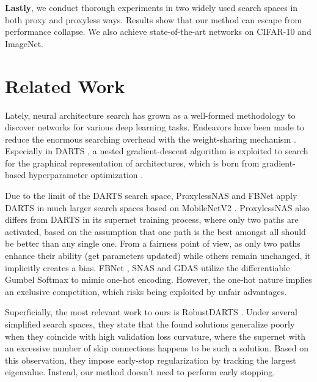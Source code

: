 \documentclass[runningheads]{llncs}
\begin{document}
\textbf{Lastly}, we conduct thorough experiments in two widely used  search spaces in both proxy and proxyless ways. Results show that our method can escape from performance collapse. We also achieve state-of-the-art networks on CIFAR-10 and ImageNet.

\section{Related Work}

Lately, neural architecture search \cite{zoph2017learning} has grown as a well-formed methodology to discover networks for various deep learning tasks. Endeavors have been made to reduce the enormous searching overhead with the weight-sharing mechanism \cite{brock2017smash,pham2018efficient,liu2018darts}. Especially in DARTS \cite{liu2018darts}, a nested gradient-descent algorithm is exploited to search for the graphical representation of architectures, which is born from gradient-based hyperparameter optimization \cite{maclaurin2015grad}.

Due to the limit of the DARTS search space,  ProxylessNAS   \cite{cai2018proxylessnas} and FBNet \cite{wu2018fbnet} apply DARTS in much larger search spaces based on MobileNetV2 \cite{sandler2018mobilenetv2}. ProxylessNAS also differs from DARTS in its supernet training process, where only two paths are activated, based on the assumption that one path is the best amongst all should be better than any single one. From a fairness point of view, as only two paths enhance their ability (get parameters updated) while others remain unchanged, it implicitly creates a bias. FBNet \cite{wu2018fbnet}, SNAS \cite{xie2018snas} and GDAS \cite{dong2019searching} utilize the differentiable Gumbel Softmax \cite{maddison2016concrete,jang2016categorical} to mimic one-hot encoding. However, the one-hot nature implies an exclusive competition,  which risks being exploited by unfair advantages.




Superficially, the most relevant work to ours is RobustDARTS \cite{zela2020understanding}. Under several simplified search spaces, they state that the found solutions generalize poorly when they coincide with high validation loss curvature, where the supernet with an excessive number of skip connections happens to be such a solution. Based on this observation, they impose early-stop regularization by tracking the largest eigenvalue. Instead, our method doesn't need to perform early stopping.
\end{document}
